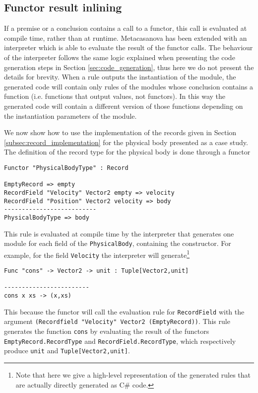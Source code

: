 \subsection{Functor result inlining}
If a premise or a conclusion contains a call to a functor, this call is evaluated at compile time, rather than at runtime. Metacasanova has been extended with an interpreter which is able to evaluate the result of the functor calls. The behaviour of the interpreter follows the same logic explained when presenting the code generation steps in Section \ref{sec:code_generation}, thus here we do not present the details for brevity. When a rule outputs the instantiation of the module, the generated code will contain only rules of the modules whose conclusion contains a function (i.e. functions that output values, not functors). In this way the generated code will contain a different version of those functions depending on the instantiation parameters of the module.

We now show how to use the implementation of the records given in Section \ref{subsec:record_implementation} for the physical body presented as a case study.
The definition of the record type for the physical body is done through a functor

\begin{lstlisting}
Functor "PhysicalBodyType" : Record

EmptyRecord => empty
RecordField "Velocity" Vector2 empty => velocity
RecordField "Position" Vector2 velocity => body
--------------------------
PhysicalBodyType => body
\end{lstlisting}

This rule is evaluated at compile time by the interpreter that generates one module for each field of the \texttt{PhysicalBody}, containing the constructor. For example, for the field \texttt{Velocity} the interpreter will generate\footnote{Note that here we give a high-level representation of the generated rules that are actually directly generated as C\# code.}

\begin{lstlisting}
Func "cons" -> Vector2 -> unit : Tuple[Vector2,unit]

------------------------
cons x xs -> (x,xs)
\end{lstlisting}

This because the functor will call the evaluation rule for \texttt{RecordField} with the argument \texttt{(Recordfield "Velocity" Vector2 (EmptyRecord))}. This rule generates the function \texttt{cons} by evaluating the result of the functors\\ \texttt{EmptyRecord.RecordType} and \texttt{RecordField.RecordType}, which respectively produce \texttt{unit} and \texttt{Tuple[Vector2,unit]}.

